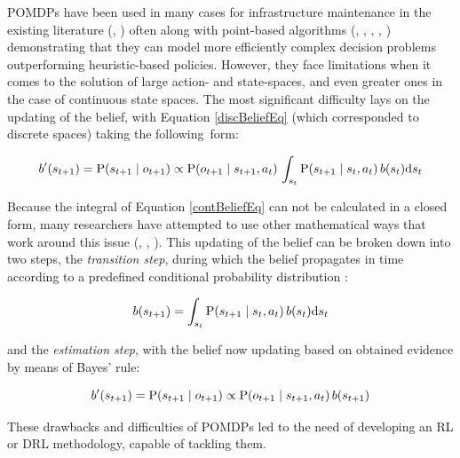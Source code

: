 \glspl{POMDP} have been used in many cases for infrastructure maintenance in the existing literature (\cite{corotis2005modeling}, \cite{nguyen2019joint}) often along with point-based algorithms (\cite{papakonstantinou2014planning2}, \cite{papakonstantinou2018pomdp}, \cite{andriotis2021value}, \cite{morato2022optimal}, \cite{morato2019pomdp}) demonstrating that they can model more efficiently complex decision problems outperforming heuristic-based policies. However, they face limitations when it comes to the solution of large action- and state-spaces, and even greater ones in the case of continuous state spaces. The most significant difficulty lays on the updating of the belief, with Equation \ref{discBeliefEq} (which corresponded to discrete spaces) taking the following~form:

\begin{equation}
    b^{\prime}(s_{t+1}) = \text{P}(s_{t+1} \mid o_{t+1}) \propto \text{P}(o_{t+1} \mid s_{t+1}, a_t) \, \int _{s_t} \text{P}(s_{t+1} \mid s_t, a_t) \, b(s_t) \mathrm{d}s_t \label{contBeliefEq}
\end{equation}

Because the integral of Equation \ref{contBeliefEq} can not be calculated in a closed form, many researchers have attempted to use other mathematical ways that work around this issue (\cite{dallaire2009bayesian}, \cite{brooks2006parametric}, \cite{zhou2010solving}). This updating of the belief can be broken down into two steps, the \textit{transition step}, during which the belief propagates in time according to a predefined conditional probability distribution \cite{morato2022optimal}:

\begin{equation}
    b(s_{t+1}) = \int _{s_t} \text{P}(s_{t+1} \mid s_t, a_t) \, b(s_t) \mathrm{d}s_t
\end{equation}

and the \textit{estimation step}, with the belief now updating based on obtained evidence by means of Bayes' rule:

\begin{equation}
    b^{\prime}(s_{t+1}) = \text{P}(s_{t+1} \mid o_{t+1}) \propto \text{P}(o_{t+1} \mid s_{t+1}, a_t) \,b(s_{t+1})
\end{equation}

These drawbacks and difficulties of \glspl{POMDP} led to the need of developing an \gls{RL} or \gls{DRL} methodology, capable of tackling them.



